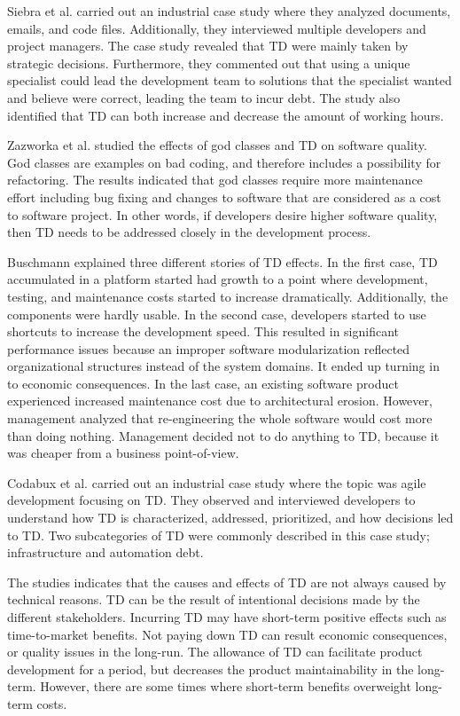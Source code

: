 Siebra et al.\cite{p247-siebra} carried out an industrial case study where they analyzed documents, emails, and code files. Additionally, they interviewed multiple developers and project managers. The case study revealed that TD were mainly taken by strategic decisions. Furthermore, they commented out that using a unique specialist could lead the development team to solutions that the specialist wanted and believe were correct, leading the team to incur debt. The study also identified that TD can both increase and decrease the amount of working hours.

Zazworka et al.\cite{zazworka2011investigating} studied the effects of god classes and TD on software quality. God classes are examples on bad coding, and therefore includes a possibility for refactoring\cite{Zazworka:2011:PDD:1985362.1985372}. The results indicated that god classes require more maintenance effort including bug fixing and changes to software that are considered as a cost to software project. In other words, if developers desire higher software quality, then TD needs to be addressed closely in the development process.

Buschmann\cite{buschmann2011pay} explained three different stories of TD effects. In the first case, TD accumulated in a platform started had growth to a point where development, testing, and maintenance costs started to increase dramatically. Additionally, the components were hardly usable. In the second case, developers started to use shortcuts to increase the development speed. This resulted in significant performance issues because an improper software modularization reflected organizational structures instead of the system domains. It ended up turning in to economic consequences. In the last case, an existing software product experienced increased maintenance cost due to architectural erosion. However, management analyzed that re-engineering the whole software would cost more than doing nothing. Management decided not to do anything to TD, because it was cheaper from a business point-of-view.

Codabux et al.\cite{p8-codabux} carried out an industrial case study where the topic was agile development focusing on TD. They observed and interviewed developers to understand how TD is characterized, addressed, prioritized, and how decisions led to TD. Two subcategories of TD were commonly described in this case study; infrastructure and automation debt. 

The studies indicates that the causes and effects of TD are not always caused by technical reasons. TD can be the result of intentional decisions made by the different stakeholders. Incurring TD may have short-term positive effects such as time-to-market benefits. Not paying down TD can result economic consequences, or quality issues in the long-run. The allowance of TD can facilitate product development for a period, but decreases the product maintainability in the long-term. However, there are some times where short-term benefits overweight long-term costs\cite{guo2011tracking}. 

